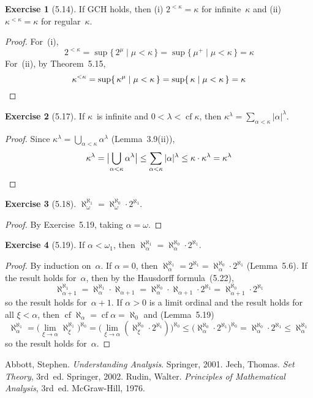 \documentclass[letterpaper,12pt]{article}
\newcommand{\bigunion}{\bigcup}
\newcommand{\mult}{\cdot}
\DeclareMathOperator{\cf}{cf}
\newcommand{\csuc}[1]{#1^+}
\newcommand{\card}[1]{|#1|}
\newcommand{\bigcard}[1]{\bigl|#1\bigr|}
\theoremstyle{definition}
\newtheorem*{exer}{Exercise}
\theoremstyle{remark}
\begin{document}
\begin{exer}[5.14]
If GCH holds, then (i) \(2^{<\kappa}=\kappa\) for infinite~\(\kappa\) and (ii) \(\kappa^{<\kappa}=\kappa\) for regular~\(\kappa\).
\end{exer}
\begin{proof}
For~(i),
\[2^{<\kappa}=\sup\{\,2^\mu\mid\mu<\kappa\,\}=\sup\{\,\csuc{\mu}\mid\mu<\kappa\,\}=\kappa\]
For~(ii), by Theorem~5.15,
\[\kappa^{<\kappa}=\sup\{\,\kappa^\mu\mid\mu<\kappa\,\}=\sup\{\,\kappa\mid\mu<\kappa\,\}=\kappa\qedhere\]
\end{proof}

\begin{exer}[5.17]
If \(\kappa\)~is infinite and \(0<\lambda<\cf\kappa\), then \(\kappa^{\lambda}=\sum_{\alpha<\kappa}\card{\alpha}^{\lambda}\).
\end{exer}
\begin{proof}
Since \(\kappa^{\lambda}=\bigunion_{\alpha<\kappa}\alpha^{\lambda}\) (Lemma~3.9(ii)),
\[\kappa^{\lambda}=\bigcard{\bigunion_{\alpha<\kappa}\alpha^{\lambda}}\le\sum_{\alpha<\kappa}\card{\alpha}^{\lambda}\le\kappa\mult\kappa^{\lambda}=\kappa^{\lambda}\qedhere\]
\end{proof}

\begin{exer}[5.18]
\(\aleph_{\omega}^{\aleph_1}=\aleph_{\omega}^{\aleph_0}\mult 2^{\aleph_1}\).
\end{exer}
\begin{proof}
By Exercise~5.19, taking \(\alpha=\omega\).
\end{proof}

\begin{exer}[5.19]
If \(\alpha<\omega_1\), then \(\aleph_{\alpha}^{\aleph_1}=\aleph_{\alpha}^{\aleph_0}\mult 2^{\aleph_1}\).
\end{exer}
\begin{proof}
By induction on~\(\alpha\). If \(\alpha=0\), then \(\aleph_{\alpha}^{\aleph_1}=2^{\aleph_1}=\aleph_{\alpha}^{\aleph_0}\mult 2^{\aleph_1}\) (Lemma~5.6). If the result holds for~\(\alpha\), then by the Hausdorff formula~(5.22),
\[\aleph_{\alpha+1}^{\aleph_1}=\aleph_{\alpha}^{\aleph_1}\mult\aleph_{\alpha+1}=\aleph_{\alpha}^{\aleph_0}\mult\aleph_{\alpha+1}\mult 2^{\aleph_1}=\aleph_{\alpha+1}^{\aleph_0}\mult 2^{\aleph_1}\]
so the result holds for~\(\alpha+1\). If \(\alpha>0\) is a limit ordinal and the result holds for all \(\xi<\alpha\), then \(\cf\aleph_{\alpha}=\cf\alpha=\aleph_0\) and (Lemma~5.19)
\[\aleph_{\alpha}^{\aleph_1}=\bigl(\lim_{\xi\to\alpha}\aleph_{\xi}^{\aleph_1}\bigr)^{\aleph_0}=\bigl(\lim_{\xi\to\alpha}(\aleph_{\xi}^{\aleph_0}\mult 2^{\aleph_1})\bigr)^{\aleph_0}\le\bigl(\aleph_{\alpha}^{\aleph_0}\mult 2^{\aleph_1}\bigr)^{\aleph_0}=\aleph_{\alpha}^{\aleph_0}\mult 2^{\aleph_1}\le\aleph_{\alpha}^{\aleph_1}\]
so the result holds for~\(\alpha\).
\end{proof}

\begin{thebibliography}{0}
 Abbott, Stephen. \textit{Understanding Analysis}. Springer, 2001.
 Jech, Thomas. \textit{Set Theory}, 3rd~ed. Springer, 2002.
 Rudin, Walter. \textit{Principles of Mathematical Analysis}, 3rd~ed. McGraw-Hill, 1976.
\end{thebibliography}
\end{document}
